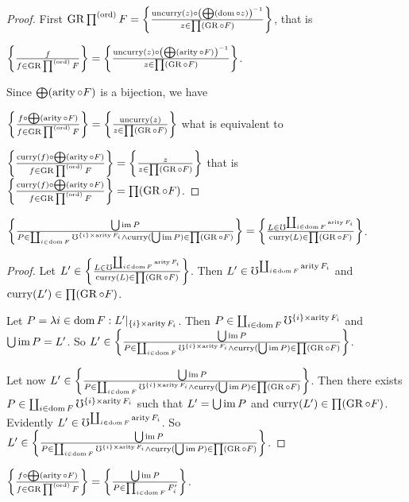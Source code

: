 \begin{proof}
First $\GR\prod^{\mathrm{(ord)}}F=\setcond{\uncurry(z)\circ\left(\bigoplus(\dom\circ z)\right)^{-1}}{z\in\prod(\GR\circ F)}$,
that is

$\setcond f{f\in\GR\prod^{\mathrm{(ord)}}F}=\setcond{\uncurry(z)\circ\left(\bigoplus(\arity\circ F)\right)^{-1}}{z\in\prod(\GR\circ F)}$.

Since $\bigoplus(\arity\circ F)$ is a bijection, we have

$\setcond{f\circ\bigoplus(\arity\circ F)}{f\in\GR\prod^{\mathrm{(ord)}}F}=\setcond{\uncurry(z)}{z\in\prod(\GR\circ F)}$
what is equivalent to

$\setcond{\curry(f)\circ\bigoplus(\arity\circ F)}{f\in\GR\prod^{\mathrm{(ord)}}F}=\setcond z{z\in\prod(\GR\circ F)}$
that is $\setcond{\curry(f)\circ\bigoplus(\arity\circ F)}{f\in\GR\prod^{\mathrm{(ord)}}F}=\prod(\GR\circ F)$.\end{proof}
\begin{lem}
$\setcond{\bigcup\im P}{P\in\coprod_{i\in\dom F}\mho^{\{i\}\times\arity F_{i}}\land\curry(\bigcup\im P)\in\prod(\GR\circ F)}=\setcond{L\in\mho^{\coprod_{i\in\dom F}\arity F_{i}}}{\curry(L)\in\prod(\GR\circ F)}$.\end{lem}
\begin{proof}
Let $L'\in\setcond{L\in\mho^{\coprod_{i\in\dom F}\arity F_{i}}}{\curry(L)\in\prod(\GR\circ F)}$.
Then $L'\in\mho^{\coprod_{i\in\dom F}\arity F_{i}}$ and $\curry(L')\in\prod(\GR\circ F)$.

Let $P=\mylamdba i{\dom F}{L'|_{\{i\}\times\arity F_{i}}}$. Then
$P\in\coprod_{i\in\dom F}\mho^{\{i\}\times\arity F_{i}}$ and $\bigcup\im P=L'$.
So $L'\in\setcond{\bigcup\im P}{P\in\coprod_{i\in\dom F}\mho^{\{i\}\times\arity F_{i}}\land\curry(\bigcup\im P)\in\prod(\GR\circ F)}$.

Let now $L'\in\setcond{\bigcup\im P}{P\in\coprod_{i\in\dom F}\mho^{\{i\}\times\arity F_{i}}\land\curry(\bigcup\im P)\in\prod(\GR\circ F)}$.
Then there exists $P\in\coprod_{i\in\dom F}\mho^{\{i\}\times\arity F_{i}}$
such that $L'=\bigcup\im P$ and $\curry(L')\in\prod(\GR\circ F)$.
Evidently $L'\in\mho^{\coprod_{i\in\dom F}\arity F_{i}}$. So $L'\in\setcond{\bigcup\im P}{P\in\coprod_{i\in\dom F}\mho^{\{i\}\times\arity F_{i}}\land\curry(\bigcup\im P)\in\prod(\GR\circ F)}$.\end{proof}
\begin{lem}
$\setcond{f\circ\bigoplus(\arity\circ F)}{f\in\GR\prod^{\mathrm{(ord)}}F}=\setcond{\bigcup\im P}{P\in\prod_{i\in\dom F}F'_{i}}$.\end{lem}
